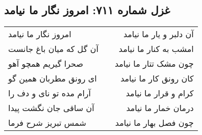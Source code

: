 \begin{center}
\section*{غزل شماره ۷۱۱: امروز نگار ما نیامد}
\label{sec:0711}
\begin{longtable}{l p{0.5cm} r}
امروز نگار ما نیامد
&&
آن دلبر و یار ما نیامد
\\
آن گل که میان باغ جانست
&&
امشب به کنار ما نیامد
\\
صحرا گیریم همچو آهو
&&
چون مشک تتار ما نیامد
\\
ای رونق مطربان همین گو
&&
کان رونق کار ما نیامد
\\
آرام مده تو نای و دف را
&&
کرام و قرار ما نیامد
\\
آن ساقی جان نگشت پیدا
&&
درمان خمار ما نیامد
\\
شمس تبریز شرح فرما
&&
چون فصل بهار ما نیامد
\\
\end{longtable}
\end{center}
